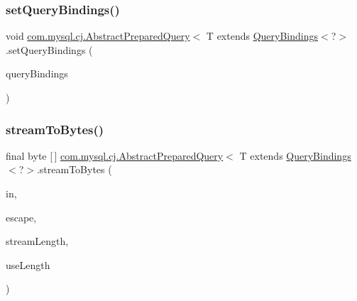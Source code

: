 \mbox{\label{classcom_1_1mysql_1_1cj_1_1_abstract_prepared_query_a2bdf26b02ecc539e9fcd06d34fcd8c9a}} 
\subsubsection{\texorpdfstring{set\+Query\+Bindings()}{setQueryBindings()}}
{\footnotesize\ttfamily void \mbox{\hyperlink{classcom_1_1mysql_1_1cj_1_1_abstract_prepared_query}{com.\+mysql.\+cj.\+Abstract\+Prepared\+Query}}$<$ T extends \mbox{\hyperlink{interfacecom_1_1mysql_1_1cj_1_1_query_bindings}{Query\+Bindings}}$<$?$>$.set\+Query\+Bindings (\begin{DoxyParamCaption}\item[{T}]{query\+Bindings }\end{DoxyParamCaption})}

\mbox{\label{classcom_1_1mysql_1_1cj_1_1_abstract_prepared_query_a2b738d5bb8d4d149721d0d59e42253cc}} 
\subsubsection{\texorpdfstring{stream\+To\+Bytes()}{streamToBytes()}}
{\footnotesize\ttfamily final byte \mbox{[}$\,$\mbox{]} \mbox{\hyperlink{classcom_1_1mysql_1_1cj_1_1_abstract_prepared_query}{com.\+mysql.\+cj.\+Abstract\+Prepared\+Query}}$<$ T extends \mbox{\hyperlink{interfacecom_1_1mysql_1_1cj_1_1_query_bindings}{Query\+Bindings}}$<$?$>$.stream\+To\+Bytes (\begin{DoxyParamCaption}\item[{Input\+Stream}]{in,  }\item[{boolean}]{escape,  }\item[{int}]{stream\+Length,  }\item[{boolean}]{use\+Length }\end{DoxyParamCaption})\hspace{0.3cm}{\ttfamily [protected]}}



